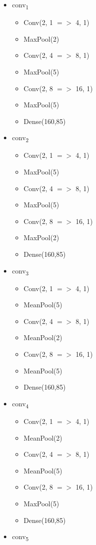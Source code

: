 \documentclass[12pt]{article}
\begin{document}
\begin{itemize}
	\item conv\textsubscript{1} \begin{itemize}
		\item Conv(2, 1 $=>$ 4, 1)
  		\item MaxPool(2)
		\item Conv(2, 4 $=>$ 8, 1)
		\item MaxPool(5)
		\item Conv(2, 8 $=>$ 16, 1)
		\item MaxPool(5)
  		\item Dense(160,85)
	\end{itemize}
	\item conv\textsubscript{2} \begin{itemize}
		\item Conv(2, 1 $=>$ 4, 1)
  		\item MaxPool(5)
		\item Conv(2, 4 $=>$ 8, 1)
		\item MaxPool(5)
		\item Conv(2, 8 $=>$ 16, 1)
		\item MaxPool(2)
  		\item Dense(160,85)
	\end{itemize}
	\item conv\textsubscript{3} \begin{itemize}
		\item Conv(2, 1 $=>$ 4, 1)
  		\item MeanPool(5)
		\item Conv(2, 4 $=>$ 8, 1)
		\item MeanPool(2)
		\item Conv(2, 8 $=>$ 16, 1)
		\item MeanPool(5)
  		\item Dense(160,85)
	\end{itemize}
	\item conv\textsubscript{4} \begin{itemize}
		\item Conv(2, 1 $=>$ 4, 1)
  		\item MeanPool(2)
		\item Conv(2, 4 $=>$ 8, 1)
		\item MeanPool(5)
		\item Conv(2, 8 $=>$ 16, 1)
		\item MaxPool(5)
  		\item Dense(160,85)
	\end{itemize}
	\item conv\textsubscript{5} \begin{itemize}

\end{itemize}
\end{itemize}
\end{document}
